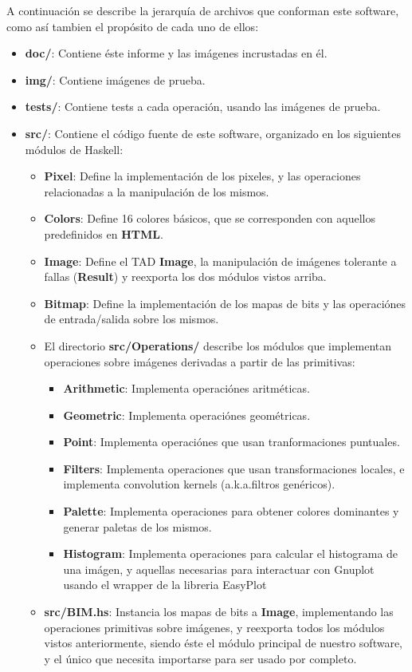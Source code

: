 \documentclass[a4paper, 11pt]{article} %
\begin{document}
	A continuación se describe la jerarquía de archivos que conforman este software, como así tambien el propósito de cada uno de ellos:

	\begin{itemize}
		\item \textbf{doc/}: Contiene éste informe y las imágenes incrustadas en él.
		\item \textbf{img/}: Contiene imágenes de prueba.
		\item \textbf{tests/}: Contiene tests a cada operación, usando las imágenes de prueba.
		\item \textbf{src/}: Contiene el código fuente de este software, organizado en los siguientes módulos de Haskell:
			\begin{itemize}
				\item \textbf{Pixel}: Define la implementación de los pixeles, y las operaciones relacionadas a la manipulación de los mismos.
				\item \textbf{Colors}: Define 16 colores básicos, que se corresponden con aquellos predefinidos en \textbf{HTML}. 
				\item \textbf{Image}: Define el TAD \textbf{Image}, la manipulación de imágenes tolerante a fallas (\textbf{Result}) y reexporta los dos módulos vistos arriba.
				\item \textbf{Bitmap}: Define la implementación de los mapas de bits y las operaciónes de entrada/salida sobre los mismos.
				\item El directorio \textbf{src/Operations/} describe los módulos que implementan operaciones sobre imágenes derivadas a partir de las primitivas:
				\begin{itemize}
					\item \textbf{Arithmetic}: Implementa operaciónes aritméticas.
					\item \textbf{Geometric}: Implementa operaciónes geométricas.
					\item \textbf{Point}: Implementa operaciónes que usan tranformaciones puntuales.
					\item \textbf{Filters}: Implementa operaciones que usan transformaciones locales, e implementa convolution kernels (a.k.a.\;filtros genéricos).
					\item \textbf{Palette}: Implementa operaciones para obtener colores dominantes y generar paletas de los mismos.
					\item \textbf{Histogram}: Implementa operaciones para calcular el histograma de una imágen, y aquellas necesarias para interactuar con Gnuplot usando el wrapper de la libreria EasyPlot
				\end{itemize}
			\item \textbf{src/BIM.hs}: Instancia los mapas de bits a \textbf{Image}, implementando las operaciones primitivas sobre imágenes, y reexporta todos los módulos vistos anteriormente, siendo éste el módulo principal de nuestro software, y el único que necesita importarse para ser usado por completo.
			\end{itemize}

	\end{itemize}
\end{document}
